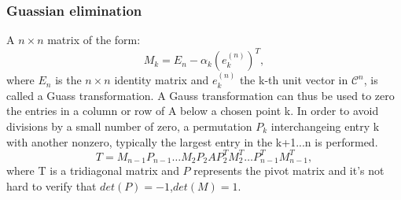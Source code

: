 \documentclass[UTF8]{ctexart}
\begin{document}
\subsubsection{Guassian elimination}
A $n\times n$ matrix of the form:
\begin{equation}
\label{14}
M_k=E_n-\alpha_k(e_k^{(n)})^T,
\end{equation}
where $E_n$ is the $n\times n$ identity matrix and $e_k^{(n)}$ the k-th unit vector in $\mathcal{C}^n$, is called a Guass transformation. A Gauss transformation can thus be used to zero the entries in a column or row of A below a chosen point k. In order to avoid divisions by a small number of zero, a permutation $P_k$ interchangeing entry k with another nonzero, typically the largest entry in the k+1...n is performed.
\begin{equation}
T=M_{n-1}P_{n-1}\ldots M_2P_2AP_2^TM_2^T\ldots P_{n-1}^TM_{n-1}^T,
\label{14}
\end{equation}
where T is a tridiagonal matrix and $P$ represents the pivot matrix and it's not hard to verify that $det(P)=-1$,$det(M)=1$.
\end{document}
